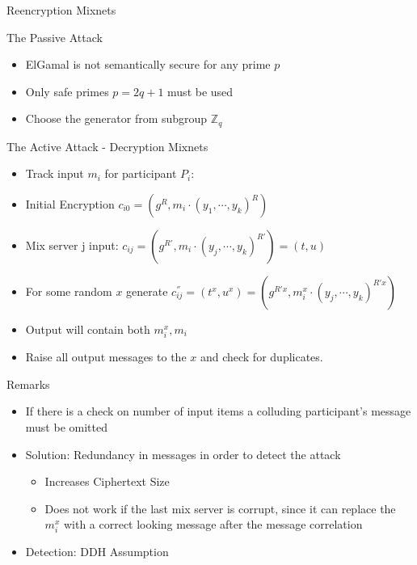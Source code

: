 \documentclass{beamer}
\begin{document}
\begin{frame}[allowframebreaks]{Reencryption Mixnets}
\begin{block}{The Passive Attack}
\begin{itemize}
\item ElGamal is not semantically secure for any prime $p$
\item Only safe primes $p=2q+1$ must be used
\item Choose the generator from subgroup $\mathbb{Z}_q$
\end{itemize}
\end{block}

\begin{block}{The Active Attack - Decryption Mixnets}
\begin{itemize}
\item Track input $m_i$ for participant $P_i$:
\item Initial Encryption $c_{i0} = (g^R, m_i \cdot (y_1,\cdots,y_k)^R)$
\item Mix server j input: $c_{ij} = (g^{R'}, m_i \cdot (y_j,\cdots,y_k)^{R'}) = (t,u)$
\item For some random $x$ generate $c^{''}_{ij} = (t^x,u^x)=(g^{R'x}, m_{i}^{x} \cdot (y_j,\cdots,y_k)^{R'x})$
\item Output will contain both $m_{i}^{x},m_{i}$
\item Raise all output messages to the $x$ and check for duplicates.
\end{itemize}
\end{block}

\begin{block}{Remarks}
\begin{itemize}
\item If there is a check on number of input items a colluding participant's message must be omitted
\item Solution: Redundancy in messages in order to detect the attack
\begin{itemize}
\item Increases Ciphertext Size
\item Does not work if the last mix server is corrupt, since it can replace the $m_{i}^{x}$ with a correct looking message after the message correlation
\end{itemize} 
\item Detection: DDH Assumption
\end{itemize}
\end{block}
\end{frame}
\end{document}
